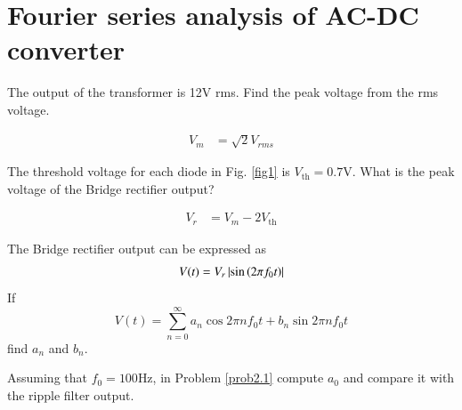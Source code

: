 \documentclass[journal,12pt,twocolumn]{IEEEtran}
\begin{document}
\section{Fourier series analysis of AC-DC converter}
\begin{problem}
The output of the transformer is 12V rms. Find the peak voltage from the rms voltage.
\end{problem}
\solution
\begin{align*}
V_{m} &= \sqrt{2}V_{rms} 
\end{align*}
\begin{problem}
The threshold voltage for each diode in Fig. \ref{fig1} is $V_{\text{th}} = 0.7$V. What is the peak voltage of the Bridge rectifier output?
\end{problem}
\solution
\begin{align*}
V_{r} &= V_{m} - 2 V_{\text{th}}
\end{align*}
\begin{problem}
\label{prob2.1}
The Bridge rectifier output can be expressed as
\begin{equation}
V(t) = V_r \left\vert\sin\left(2\pi f_0 t\right)\right\vert
\end{equation}
If
%
\begin{equation}
V(t) = \sum_{n=0}^{\infty}a_n\cos 2\pi n f_0 t + b_n \sin 2 \pi n f_0 t
\end{equation}
find $a_n$ and $b_n$.
\end{problem}
\begin{problem}
Assuming that $f_0 = 100$Hz, in Problem  \ref{prob2.1} compute $a_0$ and compare it with the ripple filter output. 
\end{problem}
\end{document}
